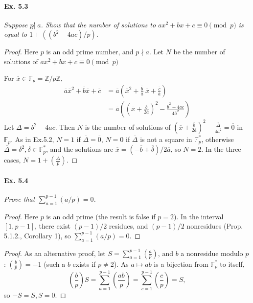 \documentclass[11pt,a4paper]{article}
\newcommand{\Z}{\mathbb{Z}}
\newcommand{\F}{\mathbb{F}}
\newcommand{\legendre}[2]{\genfrac{(}{)}{}{}{#1}{#2}}
\begin{document}
\paragraph{Ex. 5.3}

{\it Suppose $p \not | \; a$. Show that the number of solutions to $a x^2 + bx + c \equiv 0 \pmod p$ is equal to $1 + ((b^2- 4ac)/p)$.
}

\begin{proof}
Here $p$ is an odd prime number, and $p \nmid a$. Let $N$ be the number of solutions of $a x^2 + bx + c \equiv 0 \pmod p$

For $\overline{x} \in \F_p = \Z/p\Z$, 
\begin{align*}
\overline{a} \overline{x}^2 + \overline{b}\overline{x} + \overline{c} &= \overline{a}\left( \overline{x}^2 + \frac{\overline{b}}{\overline{a}}\ \overline{x} + \frac{\overline{c}}{\overline{a}}\right)\\
&=\overline{a} \left( \left(\overline{x} + \frac{\overline{b}}{2\overline{a}}\right)^2 - \frac{\overline{b}^2 - 4 \overline{a}\overline{c}}{4 \overline{a}^2} \right)
\end{align*}
Let $\Delta = b^2-4ac$. Then $N$ is the number of solutions of $\left(\overline{x} + \frac{\overline{b}}{2\overline{a}}\right)^2 - \frac{\overline{\Delta}}{4 \overline{a}^2} = \overline{0}$ in $\F_p$. As in Ex.5.2,  $N = 1$ if $\overline{\Delta} = \overline{0}$, $N=0$ if $\overline{\Delta}$ is not a square in $\F_p^*$,  otherwise $\overline{\Delta} = \delta^2, \delta \in \F_p^*$, and the solutions are $\overline{x} = (-\overline{b} \pm \overline{\delta})/ 2\overline{a}$, so  $N = 2$. In the three cases, $N = 1+ \legendre{\Delta}{p}$. 
\end{proof}

\paragraph{Ex. 5.4}

{\it Prove that $\sum_{a=1}^{p-1} (a/p) = 0$.
}

\begin{proof} Here $p$ is an odd  prime (the result is false if $p=2$). In the interval $[1,p-1]$, there exist $(p-1)/2$ residues, and $(p-1)/2$ nonresidues (Prop. 5.1.2., Corollary 1), so $\sum_{a=1}^{p-1} (a/p) = 0$.
\end{proof}

\begin{proof}
As an alternative proof, let $S = \sum\limits_{a=1}^{p-1} \legendre{a}{p}$, and  $b$ a nonresidue modulo $p$ : $\legendre{b}{p} = -1$ (such a $b$ exists if $p\neq 2$). As $a \mapsto ab$ is a bijection from $\F_p^*$ to itself, 
$$\legendre{b}{p} S = \sum_{a=1}^{p-1} \legendre{ab}{p} = \sum_{c = 1}^{p-1} \legendre{c}{p}  = S,$$
so $-S = S, S=0$.
\end{proof}
\end{document}
